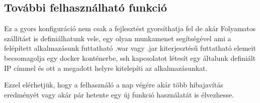 \subsection{További felhasználható funkció}
Ez a gyors konfiguráció nem csak a fejlesztést gyorsíthatja fel de akár Folyamatos szállítást is definiálhatunk vele, egy olyan munkamenet segítségével ami a felépített alkalmazásunk futtatható .war vagy .jar kiterjesztésű futtatható elemeit becsomagolja egy docker konténerbe, ssh kapcsolatot létesít egy általunk definiált IP címmel és ott a megadott helyre kitelepíti az alkalmazásunkat.

Ezzel elérhetjük, hogy a felhasználó a nap végére akár több hibajavítás eredményét vagy akár pár hetente egy új funkció használatát is élvezhesse. 